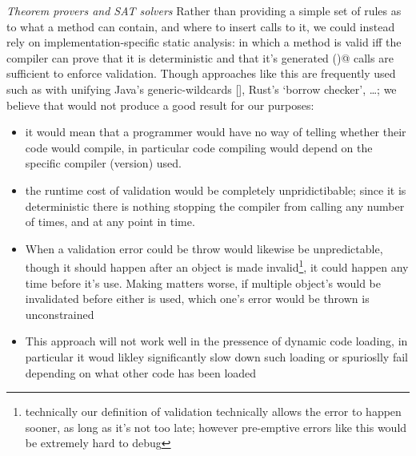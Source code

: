 \noindent\textit{Theorem provers and SAT solvers}
Rather than providing a simple set of rules as to what a \Q@validate@ method can contain,
and where to insert calls to it, we could instead rely on implementation-specific static analysis:
 in which a \Q@validate@ method is valid iff the compiler can prove that it is deterministic
 and that it’s generated \Q@validate()@ calls are sufficient to enforce validation.
Though approaches like this are frequently used such as with unifying Java’s generic-wildcards [], Rust’s ‘borrow checker’, …; we believe that would not produce a good result for our purposes: 
\begin{itemize}
	\item it would mean that a programmer would have no way of telling whether their code would compile, in particular code compiling would depend on the specific compiler (version) used.
	\item the runtime cost of validation would be completely unpridictibable; since it is deterministic there is nothing stopping the compiler from calling \Q@validate@ any number of times, and at any point in time.
	\item When a validation error could be throw would likewise be unpredictable, though it should happen after an object is made invalid\footnote{technically our definition of validation technically allows the error to happen sooner, as long as it’s not too late; however pre-emptive errors like this would be extremely hard to debug}, it could happen any time before it’s use. Making matters worse, if multiple object’s would be invalidated before either is used, which one’s error would be thrown is unconstrained
	\item This approach will not work well in the pressence of dynamic code loading, in particular it woud likley significantly slow down such loading or spurioslly fail depending on what other code has been loaded
\end{itemize}




